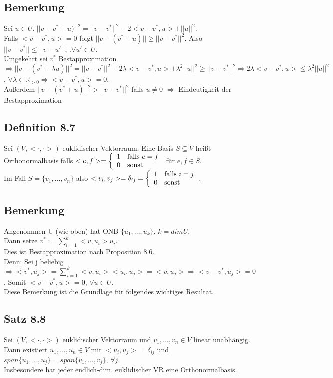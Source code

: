 \documentclass[a4paper, 12pt]{extarticle}
\newcommand{\twopartdef}[4] {
	\left\{
		\begin{array}{ll}
			#1 & #2 \\
			#3 & #4
		\end{array}
	\right.
}
\newcommand{\tn}[1]{\textnormal {#1}}
\begin{document}
\subsection*{Bemerkung}
Sei $u \in U$. $||v-v^*+u)||^2 = || v-v^*||^2-2<v-v^*, u> + ||u||^2$. \\
Falls $<v-v^*, u> = 0$ folgt $||v-(v^*+u)|| \geq ||v-v^*||^2$. Also $||v-v^*|| \leq ||v-u'||$, $.\forall u'\in U$. \\
Umgekehrt sei $v^*$ Bestapproximation $\Rightarrow ||v-(v^*+\lambda u)||^2 = ||v-v^*||^2-2\lambda<v-v^*,u> + \lambda^2||u||^2 \geq ||v-v^*||^2 \Rightarrow 2\lambda<v-v^*, u> \leq \lambda^2||u||^2$, $\forall \lambda \in \mathbb R_{>0} \Rightarrow <v-v^*, u> = 0$. \\
Außerdem $||v-(v^*+u)||^2 > ||v-v^*||^2$ falls $u \neq 0$ $\Rightarrow$ Eindeutigkeit der Bestapproximation
\subsection*{Definition 8.7} 
Sei $(V, <\cdot , \cdot>)$ euklidischer Vektorraum. Eine Basis $S \subseteq V$ heißt Orthonormalbasis falls $<e, f> = \twopartdef{1}{\tn{falls }e = f}{0}{\tn{sonst}}$ für $e,f \in S$. \\
Im Fall $S= \{v_1,...,v_n\}$ also $<v_i, v_j> = \delta_{ij} = \twopartdef{1}{\tn{falls } i=j}{0}{\tn{sonst}}$.
\subsection*{Bemerkung}
Angenommen U (wie oben) hat ONB $\{u_1,...,u_k\}$, $k = dim U$. \\
Dann setze $v^*:= \sum_{i=1}^k<v,u_i>u_i$. \\
Dies ist Bestapproximation nach Proposition 8.6. \\
Denn: Sei j beliebig $\Rightarrow <v^*, u_j> = \sum_{i=1}^k<v,u_i><u_i, u_j> = <v, u_j> \Rightarrow <v-v^*, u_j> = 0$.
Somit $<v-v^*, u> = 0$, $\forall u \in U$. \\
Diese Bemerkung ist die Grundlage für folgendes wichtiges Resultat.
\subsection*{Satz 8.8}
Sei $(V, <\cdot , \cdot >)$ euklidischer Vektorraum und $v_1,..., v_n \in V$ linear unabhängig. Dann existiert $u_1,...,u_n \in V$ mit $<u_i,u_j> = \delta_{ij}$ und $span \{u_1,...,u_j\} = span \{v_1,..., v_j\}$, $\forall j$. \\
Insbesondere hat jeder endlich-dim. euklidischer VR eine Orthonormalbasis.
\end{document}
